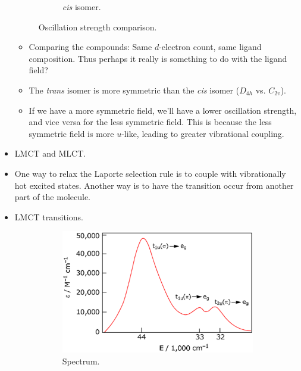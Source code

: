 \documentclass[../notes.tex]{subfiles}
\begin{document}
\begin{itemize}
\begin{figure}[h!]
        \begin{subfigure}[b]{0.3\linewidth}
            \centering
            \chemleft{[}
            \chemright{]^+}
            \caption{\emph{cis} isomer.}
            \label{fig:oscStrengthb}
        \end{subfigure}
        \caption{Oscillation strength comparison.}
        \label{fig:oscStrength}
    \end{figure}
    \begin{itemize}
        \item Comparing the compounds: Same $d$-electron count, same ligand composition. Thus perhaps it really is something to do with the ligand field?
        \item The \emph{trans} isomer is more symmetric than the \emph{cis} isomer ($D_{4h}$ vs. $C_{2v}$).
        \item If we have a more symmetric field, we'll have a lower oscillation strength, and vice versa for the less symmetric field. This is because the less symmetric field is more $u$-like, leading to greater vibrational coupling.
    \end{itemize}
    \item LMCT and MLCT.
    \item One way to relax the Laporte selection rule is to couple with vibrationally hot excited states. Another way is to have the transition occur from another part of the molecule.
    \item LMCT transitions.
    \begin{figure}[h!]
        \centering
        \begin{subfigure}[b]{0.4\linewidth}
            \centering
            \includegraphics[width=\linewidth]{../ExtFiles/LMCTa.png}
            \caption{Spectrum.}
            \label{fig:LMCTa}
        \end{subfigure}
        \begin{subfigure}[b]{0.28\linewidth}
            \centering
\end{subfigure}
\end{figure}
\end{itemize}
\end{document}
